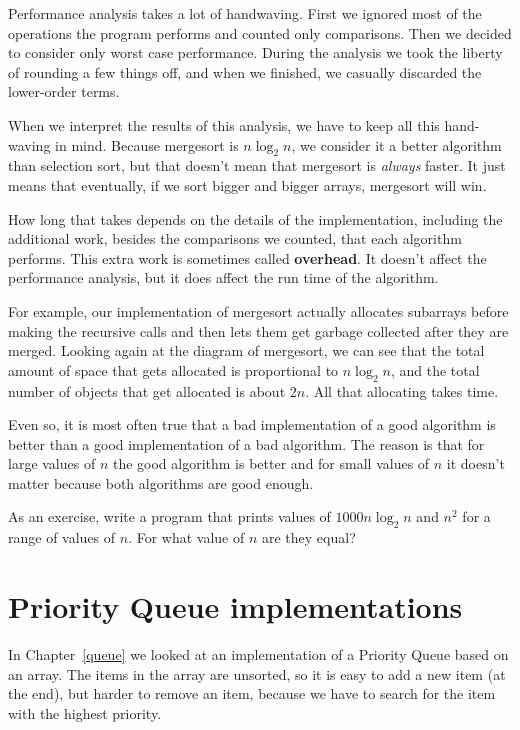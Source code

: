 Performance analysis takes a lot of handwaving.  First we ignored most
of the operations the program performs and counted only comparisons.
Then we decided to consider only worst case performance.  During the
analysis we took the liberty of rounding a few things off, and when we
finished, we casually discarded the lower-order terms.

When we interpret the results of this analysis, we have to keep
all this hand-waving in mind.  Because mergesort is $n \log_2 n$,
we consider it a better algorithm than selection sort, but that
doesn't mean that mergesort is {\em always} faster.  It just means
that eventually, if we sort bigger and bigger arrays, mergesort
will win.

How long that takes depends on the details of the implementation,
including the additional work, besides the comparisons we counted,
that each algorithm performs.  This extra work is sometimes called
{\bf overhead}.  It doesn't affect the performance analysis, but
it does affect the run time of the algorithm.

For example, our implementation of mergesort actually allocates
subarrays before making the recursive calls and then lets them get
garbage collected after they are merged.  Looking again at the diagram
of mergesort, we can see that the total amount of space that gets
allocated is proportional to $n \log_2 n$, and the total number of
objects that get allocated is about $2n$.  All that allocating takes
time.

Even so, it is most often true that a bad implementation of a good
algorithm is better than a good implementation of a bad algorithm.
The reason is that for large values of $n$ the good algorithm is
better and for small values of $n$ it doesn't matter because both
algorithms are good enough.

As an exercise, write a program that prints values of $1000 n \log_2
n$ and $n^2$ for a range of values of $n$.  For what value of $n$ are
they equal?


\section{Priority Queue implementations}

In Chapter~\ref{queue} we looked at an implementation of a Priority
Queue based on an array.  The items in the array are unsorted, so it
is easy to add a new item (at the end), but harder to remove an
item, because we have to search for the item with the highest
priority.

